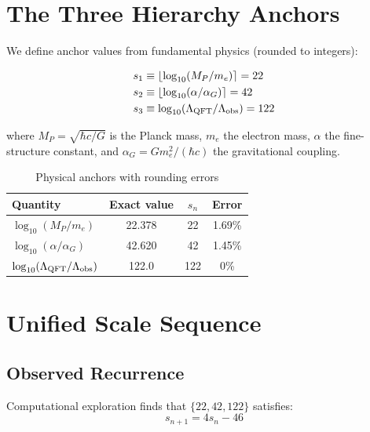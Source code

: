 \documentclass[11pt,a4paper]{article}
\begin{document}
\section{The Three Hierarchy Anchors}

We define anchor values from fundamental physics (rounded to integers):

\begin{align}
s_1 &\equiv \lfloor \log_{10}(M_P/m_e) \rceil = 22 \label{eq:s1}\\
s_2 &\equiv \lfloor \log_{10}(\alpha/\alpha_G) \rceil = 42 \label{eq:s2}\\
s_3 &\equiv \log_{10}(\Lambda_{\rm QFT}/\Lambda_{\rm obs}) = 122 \label{eq:s3}
\end{align}

where $M_P = \sqrt{\hbar c/G}$ is the Planck mass, $m_e$ the electron mass, 
$\alpha$ the fine-structure constant, and $\alpha_G = Gm_e^2/(\hbar c)$ the 
gravitational coupling.

\begin{table}[b]
\centering
\caption{Physical anchors with rounding errors}
\label{tab:anchors}
\begin{tabular}{lccc}
\hline
Quantity & Exact value & $s_n$ & Error \\
\hline
$\log_{10}(M_P/m_e)$ & 22.378 & 22 & 1.69\% \\
$\log_{10}(\alpha/\alpha_G)$ & 42.620 & 42 & 1.45\% \\
$\log_{10}(\Lambda_{\rm QFT}/\Lambda_{\rm obs})$ & 122.0 & 122 & 0\% \\
\hline
\end{tabular}
\end{table}

\section{Unified Scale Sequence}

\subsection{Observed Recurrence}

Computational exploration finds that $\{22, 42, 122\}$ satisfies:
\begin{equation}
\boxed{s_{n+1} = 4s_n - 46}
\label{eq:recurrence}
\end{equation}
\end{document}
